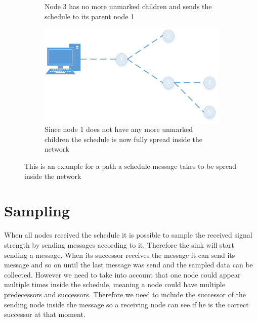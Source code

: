 \begin{figure}[htbp]
\begin{subfigure}[t]{0.4\textwidth}
   	 	\caption{Node 3 has no more unmarked children and sends the schedule to its parent node 1}
    	\label{fig:spreading9}
    \end{subfigure}
    \quad
    \quad	
    \begin{subfigure}[t]{0.4\textwidth}
		\centering         
        \includegraphics[scale=0.6]{content/images/ScheduleSpreading/Part10}
        \caption{Since node 1 does not have any more unmarked children the schedule is now fully spread inside the network}
        \label{fig:spreading10}
    \end{subfigure}
    \caption{This is an example for a path a schedule message takes to be spread inside the network}
     \label{fig:spreading}
\end{figure}

\section{Sampling}
When all nodes received the schedule it is possible to sample the received signal strength by sending messages according to it. Therefore the sink will start sending a message. When its successor receives the message it can send its message and so on until the last message was send and the sampled data can be collected. However we need to take into account that one node could appear multiple times inside the schedule, meaning a node could have multiple predecessors and successors. Therefore we need to include the successor of the sending node inside the message so a receiving node can see if he is the correct successor at that moment. 
